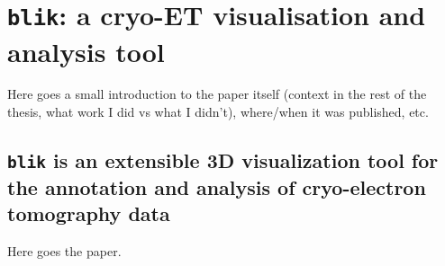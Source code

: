 \chapter{\texttt{blik}: a cryo-ET visualisation and analysis tool}

Here goes a small introduction to the paper itself (context in the rest of the thesis, what work I did vs what I didn't), where/when it was published, etc.

\section*{\texttt{blik} is an extensible 3D visualization tool for the annotation and analysis of cryo-electron tomography data}


Here goes the paper.

% 
